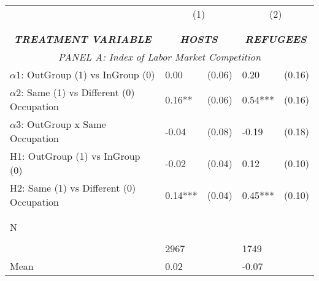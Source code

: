\begin{tabular}{l*{4}{l}} \toprule 
                &\multicolumn{2}{c}{(1)}&\multicolumn{2}{c}{(2)}\\
                &\multicolumn{2}{c}{ } &\multicolumn{2}{c}{ } \\
\\[-0.6cm] \multicolumn{1}{c}{\textit{\textbf{TREATMENT VARIABLE}}} & \multicolumn{2}{c}{\textit{\textbf{HOSTS}}} & \multicolumn{2}{c}{\textit{\textbf{REFUGEES}}} \\  \multicolumn{5}{c}{\textit{PANEL A: Index of Labor Market Competition}} \\  \midrule  
$\alpha1$: OutGroup (1) vs InGroup (0)&     0.00   &   (0.06)&     0.20   &   (0.16)\\
$\alpha2$: Same (1) vs Different (0) Occupation&     0.16** &   (0.06)&     0.54***&   (0.16)\\
$\alpha3$: OutGroup x Same Occupation&    -0.04   &   (0.08)&    -0.19   &   (0.18)\\
 
H1: OutGroup (1) vs InGroup (0)&    -0.02   &   (0.04)&     0.12   &   (0.10)\\
 
H2: Same (1) vs Different (0) Occupation&     0.14***&   (0.04)&     0.45***&   (0.10)\\
 
\\\\[-0.5cm] N \\\\[-0.6cm]&     2967   &         &     1749   &         \\
Mean            &     0.02&         &    -0.07&         \\
 
\bottomrule  \end{tabular}  
